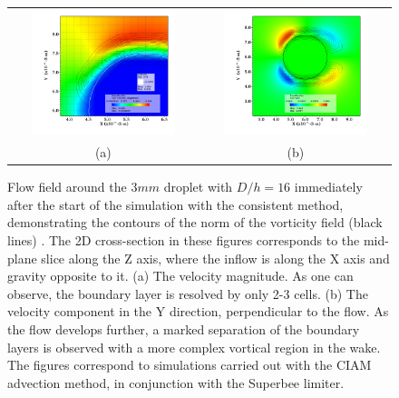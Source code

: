\begin{figure}
\begin{center}
\begin{tabular}{cc}
\hspace*{-1.0cm}
\includegraphics[width=0.8\textwidth]{plots/raindrop/mc_vorticity_zoom.png} & 
\hspace{-0.4cm}%
\includegraphics[width=0.8\textwidth]{plots/raindrop/mc_vorticity.png} \\ 
\hspace{-0.8cm}%
(a) & (b)
\end{tabular}
\end{center}
\caption{Flow field around the $3 mm$ droplet with $D/h = 16$ immediately 
after the start of the simulation with the consistent method, 
demonstrating the contours of the norm of the vorticity field (black lines) . 
The 2D cross-section in these figures corresponds to the 
mid-plane slice along the Z axis, where the inflow is along 
the X axis and gravity opposite to it. (a) The velocity magnitude. 
As one can observe, the boundary layer is resolved by only 2-3 cells. 
(b) The velocity component in the Y direction, perpendicular to the flow. 
As the flow develops further, a marked separation of the boundary layers is observed with 
a more complex vortical region in the wake.
The figures correspond to simulations carried out with the 
CIAM advection method, in conjunction with the Superbee limiter.}
\label{flow_field}
\end{figure}


